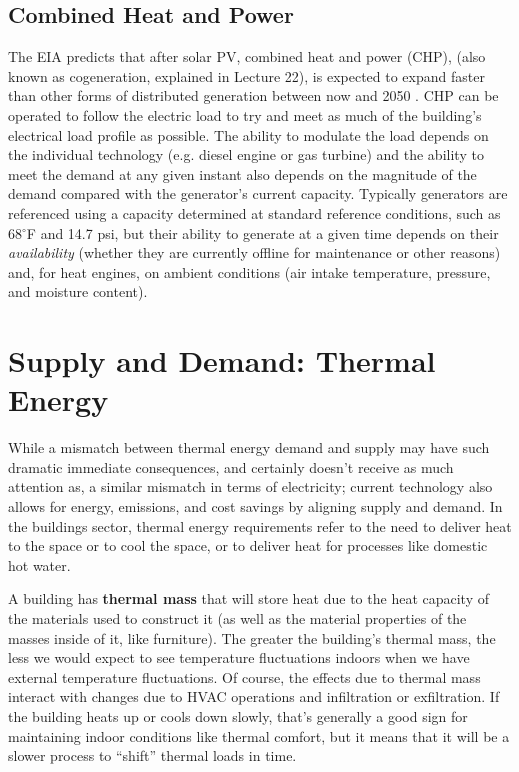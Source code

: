 \documentclass[10pt]{article}
\begin{document}
\subsection{Combined Heat and Power}
\label{chpe}

The EIA predicts that after solar PV, combined heat and power (CHP), (also known as cogeneration, explained in Lecture 22), is expected to expand faster than other forms of distributed generation between now and 2050 \cite{aeo2019}. CHP can be operated to follow the electric load to try and meet as much of the building's electrical load profile as possible. The ability to modulate the load depends on the individual technology (e.g. diesel engine or gas turbine) and the ability to meet the demand at any given instant also depends on the magnitude of the demand compared with the generator's current capacity. Typically generators are referenced using a capacity determined at standard reference conditions, such as 68$^{\circ}$F and 14.7 psi, but their ability to generate at a given time depends on their \textit{availability} (whether they are currently offline for maintenance or other reasons) and, for heat engines, on ambient conditions (air intake temperature, pressure, and moisture content). 




\section{Supply and Demand: Thermal Energy}

While a mismatch between thermal energy demand and supply may have such dramatic immediate consequences, and certainly doesn't receive as much attention as, a similar mismatch in terms of electricity; current technology also allows for energy, emissions, and cost savings by aligning supply and demand. In the buildings sector, thermal energy requirements refer to the need to deliver heat to the space or to cool the space, or to deliver heat for processes like domestic hot water.

A building has \textbf{thermal mass} that will store heat due to the heat capacity of the materials used to construct it (as well as the material properties of the masses inside of it, like furniture). The greater the building's thermal mass, the less we would expect to see temperature fluctuations indoors when we have external temperature fluctuations. Of course, the effects due to thermal mass interact with changes due to HVAC operations and infiltration or exfiltration. If the building heats up or cools down slowly, that's generally a good sign for maintaining indoor conditions like thermal comfort, but it means that it will be a slower process to ``shift'' thermal loads in time.
\end{document}
